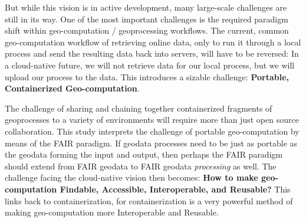 But while this vision is in active development, many large-scale challenges are still in its way. 
One of the most important challenges is the required paradigm shift within geo-computation / geoprocessing workflows. 
The current, common geo-computation workflow of retrieving online data, only to run it through a local process and send the resulting data back into servers, will have to be reversed: In a cloud-native future, we will not retrieve data for our local process, but we will upload our process to the data.  
This introduces a sizable challenge: \textbf{Portable, Containerized Geo-computation}.




The challenge of sharing and chaining together containerized fragments of geoprocesses to a variety of environments will require more than just open source collaboration. 
This study interprets the challenge of portable geo-computation by means of the FAIR paradigm. 
If geodata processes need to be just as portable as the geodata forming the input and output, then perhaps the FAIR paradigm should extend from FAIR geodata to FAIR geodata \emph{processing} as well.
The challenge facing the cloud-native vision then becomes: \textbf{How to make geo-computation Findable, Accessible, Interoperable, and Reusable?} 
This links back to containerization, for containerization is a very powerful method of making geo-computation more Interoperable and Reusable.



